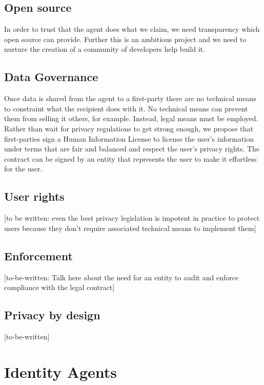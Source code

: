 \documentclass[11pt, oneside]{article}   	%
\begin{document}
\subsection{Open source}

In order to trust that the agent does what we claim, we need transparency which open source can provide. Further this is an ambitious project and we need to nurture the creation of a community of developers help build it.

\subsection{Data Governance}

Once data is shared from the agent to a first-party there are no technical means to constraint what the recipient does with it. No technical means can prevent them from selling it others, for example. Instead, legal means must be employed. Rather than wait for privacy regulations to get strong enough, we propose that first-parties sign a Human Information License to license the user's information under terms that are fair and balanced and respect the user's privacy rights. The contract can be signed by an entity that represents the user to make it effortless for the user.

\subsection{User rights}

[to be written: even the best privacy legislation is impotent in practice to protect users because they don't require associated technical means to implement them]

\subsection{Enforcement}

[to-be-written: Talk here about the need for an entity to audit and enforce compliance with the legal contract]

\subsection{Privacy by design}
[to-be-written]

\section{Identity Agents} %
\end{document}
